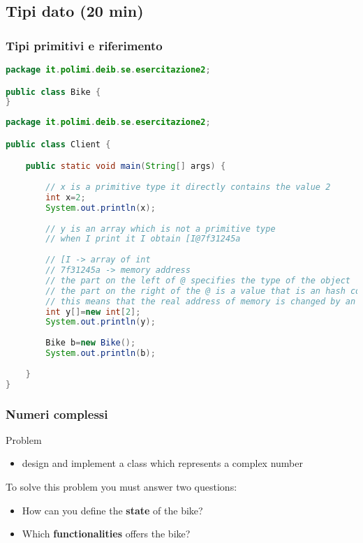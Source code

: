 \documentclass{article}
\begin{document}
\subsection{Tipi dato (20 min)} 

\subsubsection{Tipi primitivi e riferimento}
\begin{lstlisting}[language=Java,escapechar=|]
package it.polimi.deib.se.esercitazione2;

public class Bike {	
}
\end{lstlisting}

\begin{lstlisting}[language=Java,escapechar=|]
package it.polimi.deib.se.esercitazione2;

public class Client {

	public static void main(String[] args) {
		
		// x is a primitive type it directly contains the value 2
		int x=2;
		System.out.println(x);
		
		// y is an array which is not a primitive type 
		// when I print it I obtain [I@7f31245a
		
		// [I -> array of int
		// 7f31245a -> memory address
		// the part on the left of @ specifies the type of the object
		// the part on the right of the @ is a value that is an hash code of the memory address in which the object is allocated
		// this means that the real address of memory is changed by an hashing function before being printed
		int y[]=new int[2];
		System.out.println(y);
		
		Bike b=new Bike();
		System.out.println(b);
		
	}
}
\end{lstlisting}

\subsubsection{Numeri complessi}
Problem
\begin{itemize}
\item  design and implement a class which represents a complex number
\end{itemize}

To solve this problem you must answer two questions:
\begin{itemize}
\item How can you define the \textbf{state} of the bike?
\item Which \textbf{functionalities} offers the bike?
\end{itemize}
 
\end{document}
